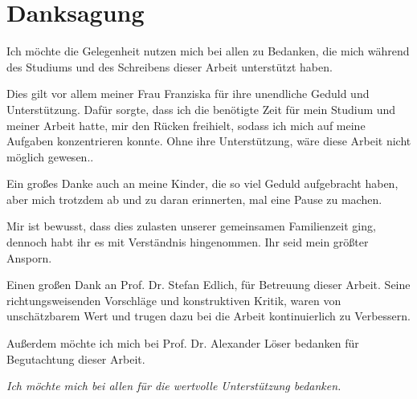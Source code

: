 \chapter*{Danksagung}
Ich möchte die Gelegenheit nutzen mich bei allen zu Bedanken, die mich während des Studiums und des Schreibens dieser Arbeit unterstützt haben.\vspace{0.2cm}

Dies gilt vor allem meiner Frau Franziska für ihre unendliche Geduld und Unterstützung. Dafür sorgte, dass ich die benötigte Zeit für mein Studium und meiner Arbeit hatte, mir den Rücken freihielt, sodass ich mich auf meine Aufgaben konzentrieren konnte. Ohne ihre Unterstützung, wäre diese Arbeit nicht möglich gewesen..\vspace{0.2cm}

Ein großes Danke auch an meine Kinder, die so viel Geduld aufgebracht haben, aber mich trotzdem ab und zu daran erinnerten, mal eine Pause zu machen.\vspace{0.2cm}

Mir ist bewusst, dass dies zulasten unserer gemeinsamen Familienzeit ging, dennoch habt ihr es mit Verständnis hingenommen. Ihr seid mein größter Ansporn.\vspace{0.2cm}

Einen großen Dank an Prof. Dr. Stefan Edlich, für Betreuung dieser Arbeit. Seine richtungsweisenden Vorschläge und konstruktiven Kritik, waren von unschätzbarem Wert und trugen dazu bei die Arbeit kontinuierlich zu Verbessern.\vspace{0.2cm}

Außerdem möchte ich mich bei Prof. Dr. Alexander Löser bedanken für Begutachtung dieser Arbeit.\vspace{0.5cm}

\begin{flushright}
	\textit{Ich möchte mich bei allen für die wertvolle Unterstützung bedanken.}
\end{flushright}